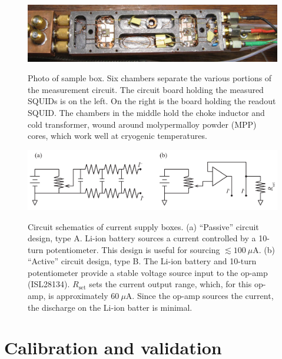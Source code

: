 \begin{figure}
\centering\includegraphics[width=6.5in]{experimental/sample_box.jpg}\\
\caption[Photo of sample box]{Photo of sample box. Six chambers separate the various portions of the measurement circuit. The circuit board holding the measured SQUIDs is on the left. On the right is the board holding the readout SQUID. The chambers in the middle hold the choke inductor and cold transformer, wound around molypermalloy powder (MPP) cores, which work well at cryogenic temperatures.}
\label{fig:experimental:sample_box}
\end{figure}


\begin{figure}
\centering\includegraphics{experimental/Fig_current_supplies}\\
\caption[Circuit schematics of current supply boxes]{Circuit schematics of current supply boxes. (a) ``Passive'' circuit design, type A. Li-ion battery sources a current controlled by a 10-turn potentiometer. This design is useful for sourcing $\lesssim 100~\mu$A. (b) ``Active'' circuit design, type B. The Li-ion battery and 10-turn potentiometer provide a stable voltage source input to the op-amp (ISL28134). $R_{\text{set}}$ sets the current output range, which, for this op-amp, is approximately $60~\mu$A. Since the op-amp sources the current, the discharge on the Li-ion batter is minimal.}
\label{fig:experimental:bias_boxes}
\end{figure}

\section{Calibration and validation}

